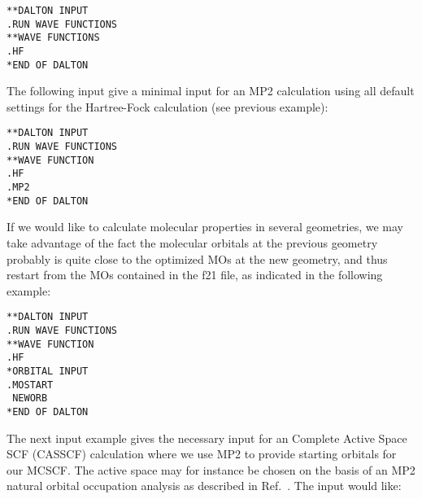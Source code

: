 \begin{verbatim}
**DALTON INPUT
.RUN WAVE FUNCTIONS
**WAVE FUNCTIONS
.HF
*END OF DALTON
\end{verbatim}
\label{sirius_ex1a}

The following input give a minimal input for an
MP2
calculation using all default settings for the Hartree-Fock
calculation (see previous example): 

\begin{verbatim}
**DALTON INPUT
.RUN WAVE FUNCTIONS
**WAVE FUNCTION
.HF
.MP2
*END OF DALTON
\end{verbatim}
\label{sirius_ex1b}

If we would like to calculate molecular properties in several
geometries, we may take advantage of the fact the molecular orbitals
at the previous geometry probably is quite close to the optimized MOs
at the new geometry, and thus restart from the MOs
contained in the f21 file, as indicated in the
following example: 

\begin{verbatim}
**DALTON INPUT
.RUN WAVE FUNCTIONS
**WAVE FUNCTION
.HF
*ORBITAL INPUT
.MOSTART
 NEWORB
*END OF DALTON
\end{verbatim}
\label{sirius_ex2}

\begin{center}
\end{center}

The next input example gives the necessary input for an Complete
Active Space SCF (CASSCF) calculation where we use MP2 to provide
starting orbitals for our MCSCF. The 
active space may for instance be 
chosen on the basis of an MP2 natural orbital occupation
analysis as
described in Ref.~\cite{hjajpjhajojcp88}. The input would like:

